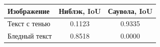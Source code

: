 \begin{tabular}{lcc}\toprule
Изображение & Ниблэк, IoU & Саувола, IoU \\
\midrule
Текст с тенью & 0.1123 & 0.9335 \\
Бледный текст & 0.8518 & 0.0000 \\
\bottomrule\end{tabular}
